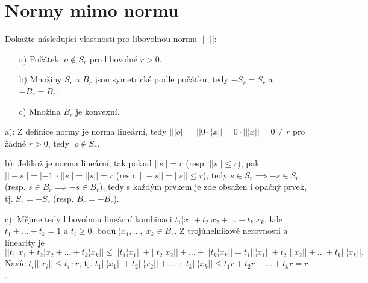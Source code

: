 \documentclass[12pt]{article}					%
\begin{document}
\section*{Normy mimo normu}
    \begin{priklad}[8.1]
        Dokažte následující vlastnosti pro libovolnou normu $||·||$:

        \begin{itemize}
            \item[a)] Počátek $¦o\notin S_r$ pro libovolné $r > 0$.
            \item[b)] Množiny $S_r$ a $B_r$ jsou symetrické podle počátku, tedy $−S_r = S_r$ a $−B_r = B_r$.
            \item[c)] Množina $B_r$ je konvexní.
        \end{itemize}

        \begin{dukazin}
            a): Z definice normy je norma lineární, tedy $||¦o|| = ||0·¦x|| = 0·||¦x|| = 0 ≠ r$ pro žádné $r > 0$, tedy $¦o \notin S_r$.

            \noindent b): Jelikož je norma lineární, tak pokud $||s|| = r$ (resp. $||s|| ≤ r$), pak $||-s|| = |-1|·||s|| = ||s|| = r$ (resp. $||-s|| = ||s|| ≤ r$), tedy $s \in S_r \implies -s \in S_r$ (resp. $s \in B_r \implies -s \in B_r$), tedy s každým prvkem je zde obsažen i opačný prvek, tj. $S_r = -S_r$ (resp. $B_r = -B_r$).

            \noindent c): Mějme tedy libovolnou lineární kombinaci $t_1¦x_1 + t_2¦x_2 + … + t_k¦x_k$, kde $t_1 + … + t_k = 1$ a $t_i ≥ 0$, bodů $¦x_1, …, ¦x_k \in B_r$. Z trojúhelníkové nerovnosti a linearity je
            $$ ||t_1¦x_1 + t_2¦x_2 + … + t_k¦x_k|| ≤ ||t_1¦x_1|| + ||t_2¦x_2|| + … + ||t_k¦x_k|| = t_1||¦x_1|| + t_2||¦x_2|| + … + t_k||¦x_k||. $$
            Navíc $t_i||¦x_i|| ≤ t_i·r$, tj. $t_1||¦x_1|| + t_2||¦x_2|| + … + t_k||¦x_k|| ≤ t_1r + t_2r + … + t_kr = r$.
        \end{dukazin}
    \end{priklad}

\pagebreak
\end{document}
